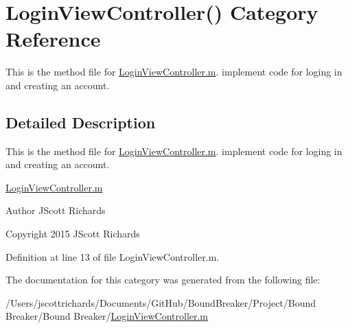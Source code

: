 \hypertarget{category_login_view_controller_07_08}{}\section{Login\+View\+Controller() Category Reference}
\label{category_login_view_controller_07_08}


This is the method file for \hyperlink{_login_view_controller_8m}{Login\+View\+Controller.\+m}. implement code for loging in and creating an account.  




\subsection{Detailed Description}
This is the method file for \hyperlink{_login_view_controller_8m}{Login\+View\+Controller.\+m}. implement code for loging in and creating an account. 

\hyperlink{_login_view_controller_8m}{Login\+View\+Controller.\+m}

\begin{DoxyAuthor}{Author}
J\+Scott Richards 
\end{DoxyAuthor}
\begin{DoxyCopyright}{Copyright}
2015 J\+Scott Richards 
\end{DoxyCopyright}


Definition at line 13 of file Login\+View\+Controller.\+m.



The documentation for this category was generated from the following file\+:\begin{DoxyCompactItemize}
\item 
/\+Users/jscottrichards/\+Documents/\+Git\+Hub/\+Bound\+Breaker/\+Project/\+Bound Breaker/\+Bound Breaker/\hyperlink{_login_view_controller_8m}{Login\+View\+Controller.\+m}\end{DoxyCompactItemize}
